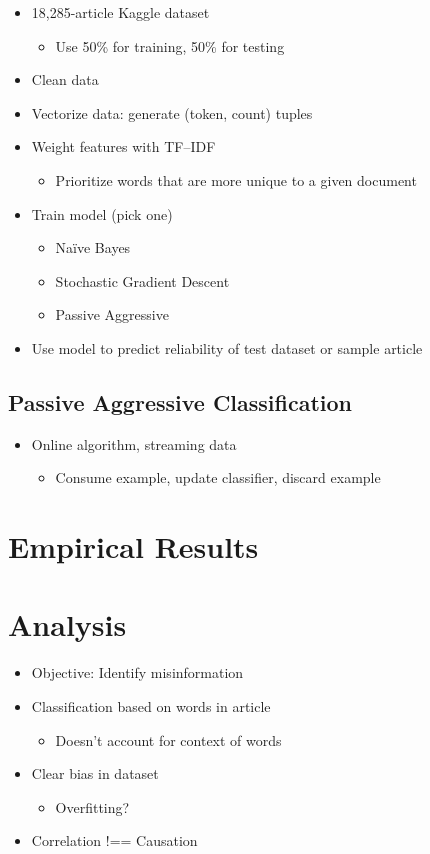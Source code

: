 \documentclass[12pt]{article}
\begin{document}
	\begin{itemize}
		\item 18,285-article Kaggle dataset
		\begin{itemize}
			\item Use 50\% for training, 50\% for testing
		\end{itemize}
		\item Clean data
		\item Vectorize data: generate (token, count) tuples
		\item Weight features with TF–IDF
		\begin{itemize}
			\item Prioritize words that are more unique to a given document
		\end{itemize}
		\item Train model (pick one)
		\begin{itemize}
			\item Naïve Bayes
			\item Stochastic Gradient Descent
			\item Passive Aggressive
		\end{itemize}
		\item Use model to predict reliability of test dataset or sample article
	\end{itemize}

	\subsection{Passive Aggressive Classification}

	\begin{itemize}
		\item Online algorithm, streaming data
		\begin{itemize}
			\item Consume example, update classifier, discard example
		\end{itemize}
	\end{itemize}

	\section{Empirical Results}
	\section{Analysis}

	\begin{itemize}
		\item Objective: Identify misinformation
		\item Classification based on words in article
		\begin{itemize}
			\item Doesn’t account for context of words
		\end{itemize}
		\item Clear bias in dataset
		\begin{itemize}
			\item Overfitting?
		\end{itemize}
		\item Correlation !== Causation
	\end{itemize}
\end{document}
